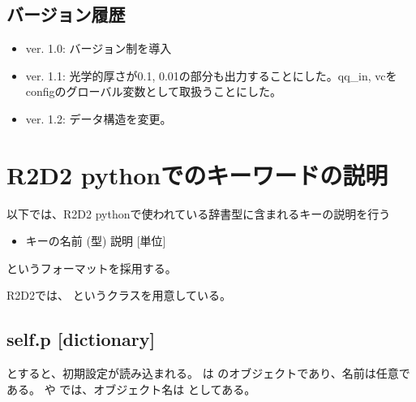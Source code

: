 \documentclass[letterpaper,10pt,dvipdfmx,report]{sphinxmanual}
\begin{document}
\section{バージョン履歴}
\label{\detokenize{io:id5}}\begin{itemize}
\item {} 
ver. 1.0: バージョン制を導入

\item {} 
ver. 1.1: 光学的厚さが0.1, 0.01の部分も出力することにした。qq\_in, vcをconfigのグローバル変数として取扱うことにした。

\item {} 
ver. 1.2: データ構造を変更。

\end{itemize}


\chapter{R2D2 pythonでのキーワードの説明}
\label{\detokenize{notation:r2d2-python}}\label{\detokenize{notation::doc}}
以下では、R2D2 pythonで使われている辞書型に含まれるキーの説明を行う
\begin{itemize}
\item {} 
キーの名前 (型) \sphinxhyphen{}\sphinxhyphen{} 説明 {[}単位{]}

\end{itemize}

というフォーマットを採用する。

R2D2では、 というクラスを用意している。


\section{self.p {[}dictionary{]}}
\label{\detokenize{notation:self-p-dictionary}}
\begin{sphinxVerbatim}[commandchars=\\\{\}]
 
  
\end{sphinxVerbatim}

とすると、初期設定が読み込まれる。  は  のオブジェクトであり、名前は任意である。  や  では、オブジェクト名は  としてある。
\end{document}
